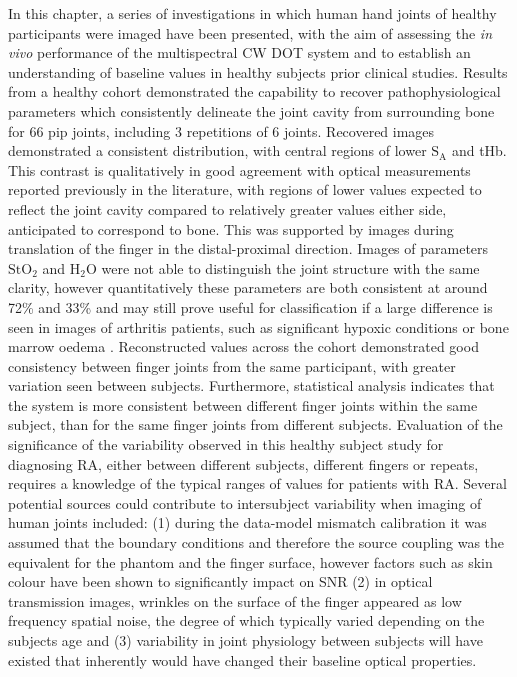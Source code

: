 \documentclass[twoside]{bhamthesis}
\theoremstyle{definition}
\begin{document}
In this chapter, a series of investigations in which human hand joints of healthy participants were imaged have been presented, with the aim of assessing the \textit{in vivo} performance of the multispectral CW DOT system and to establish an understanding of baseline values in healthy subjects prior clinical studies. Results from a healthy cohort demonstrated the capability to recover pathophysiological parameters which consistently delineate the joint cavity from surrounding bone for 66 pip joints, including 3 repetitions of 6 joints. Recovered images demonstrated a consistent distribution, with central regions of lower $\mathrm{S_A}$ and tHb. This contrast is qualitatively in good agreement with optical measurements reported previously in the literature, with regions of lower values expected to reflect the joint cavity compared to relatively greater values either side, anticipated to correspond to bone. This was supported by images during translation of the finger in the distal-proximal direction. Images of parameters $\mathrm{StO_2}$ and $\mathrm{H_2O}$ were not able to distinguish the joint structure with the same clarity, however quantitatively these parameters are both consistent at around 72\% and 33\% and may still prove useful for classification if a large difference is seen in images of arthritis patients, such as significant hypoxic conditions \cite{ng2010synovial} or bone marrow oedema \cite{sudol2013significance}. Reconstructed values across the cohort demonstrated good consistency between finger joints from the same participant, with greater variation seen between subjects. Furthermore, statistical analysis indicates that the system is more consistent between different finger joints within the same subject, than for the same finger joints from different subjects. Evaluation of the significance of the variability observed in this healthy subject study for diagnosing RA, either between different subjects, different fingers or repeats, requires a knowledge of the typical ranges of values for patients with RA. Several potential sources could contribute to intersubject variability when imaging of human joints included: (1) during the data-model mismatch calibration it was assumed that the boundary conditions and therefore the source coupling was the equivalent for the phantom and the finger surface, however factors such as skin colour have been shown to significantly impact on SNR \cite{zonios2001skin} (2) in optical transmission images, wrinkles on the surface of the finger appeared as low frequency spatial noise, the degree of which typically varied depending on the subjects age and (3) variability in joint physiology between subjects will have existed that inherently would have changed their baseline optical properties.
\end{document}

